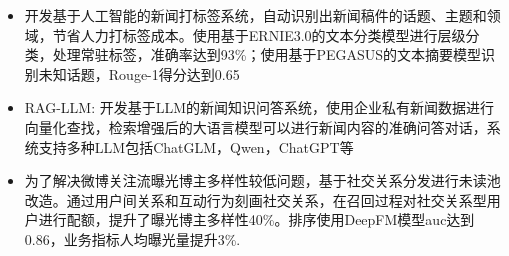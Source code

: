 

\begin{itemize}
      \item 开发基于人工智能的新闻打标签系统，自动识别出新闻稿件的话题、主题和领域，节省人力打标签成本。使用基于ERNIE3.0的文本分类模型进行层级分类，处理常驻标签，准确率达到93\%；使用基于PEGASUS的文本摘要模型识别未知话题，Rouge-1得分达到0.65
      \item RAG-LLM: 开发基于LLM的新闻知识问答系统，使用企业私有新闻数据进行向量化查找，检索增强后的大语言模型可以进行新闻内容的准确问答对话，系统支持多种LLM包括ChatGLM，Qwen，ChatGPT等
\end{itemize}





\begin{itemize}
      \item 为了解决微博关注流曝光博主多样性较低问题，基于社交关系分发进行未读池改造。通过用户间关系和互动行为刻画社交关系，在召回过程对社交关系型用户进行配额，提升了曝光博主多样性40\%。排序使用DeepFM模型auc达到0.86，业务指标人均曝光量提升3\%. 
\end{itemize}


